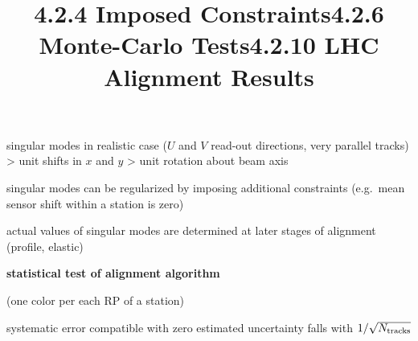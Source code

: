 \> singular modes in realistic case ($U$ and $V$ read-out directions, very parallel tracks)
\>> unit shifts in $x$ and $y$
\>> unit rotation about beam axis


\vfil
\title{4.2.4 Imposed Constraints}
\vskip-3mm

\> singular modes can be regularized by imposing additional constraints (e.g.~mean sensor shift within a station is zero)

\> actual values of singular modes are determined at later stages of alignment (profile, elastic)

\newpage%
\title{4.2.6 Monte-Carlo Tests}

\centerline{\bf statistical test of alignment algorithm}
\centerline{(one color per each RP of a station)}


\> systematic error compatible with zero
\> estimated uncertainty falls with $1/\sqrt{N_{\rm tracks}}$

\newpage%
\title{4.2.10 LHC Alignment Results}
\vskip-3mm


